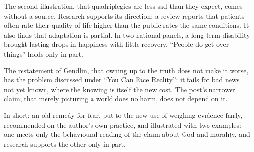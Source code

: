 \begin{afterword}
The second illustration, that quadriplegics are less sad than they expect, comes without a source. Research supports its direction: a review reports that patients often rate their quality of life higher than the public rates the same conditions. It also finds that adaptation is partial. In two national panels, a long-term disability brought lasting drops in happiness with little recovery. ``People do get over things'' holds only in part.

The restatement of Gendlin, that owning up to the truth does not make it worse, has the problem discussed under ``You Can Face Reality'': it fails for bad news not yet known, where the knowing is itself the new cost. The post's narrower claim, that merely picturing a world does no harm, does not depend on it.

In short: an old remedy for fear, put to the new use of weighing evidence fairly, recommended on the author's own practice, and illustrated with two examples: one meets only the behavioural reading of the claim about God and morality, and research supports the other only in part.
\end{afterword}
